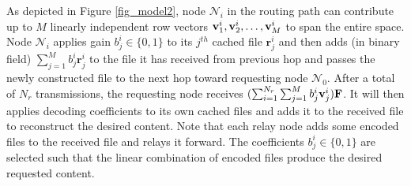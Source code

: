 \documentclass[10pt,journal]{IEEEtran}
\begin{document}
As depicted in Figure \ref{fig_model2}, node $\mathcal{N}_i$ in the routing path can contribute up to $M$ linearly independent row vectors ${\bf v}_1^i,{\bf v}_2^i,\dots,{\bf v}_M^i$ to span the entire space. Node $\mathcal{N}_i$  applies gain $b_j^i \in \{0,1\}$ to its $j^{th}$ cached file $\mathbf{r}_j^i$ and then adds (in binary field) $\sum_{j=1}^M b_j^i \mathbf{r}_j^i$ to the file it has received from previous hop and passes the newly constructed file to the next hop toward requesting node $\mathcal{N}_0$. After a total of $N_r$ transmissions, the  requesting node receives $ (\sum_{i=1}^{N_r} \sum_{j=1}^M b^i_j {\bf v}^i_j) \mathbf{F}$. It will then applies decoding coefficients to its own cached files and adds it to the received file to reconstruct the desired content. Note that each relay node adds some encoded files to the received file and relays it forward. The coefficients $b_j^i \in \{0,1\}$ are selected such that the linear combination of encoded files produce the desired requested content.  
\end{document}
